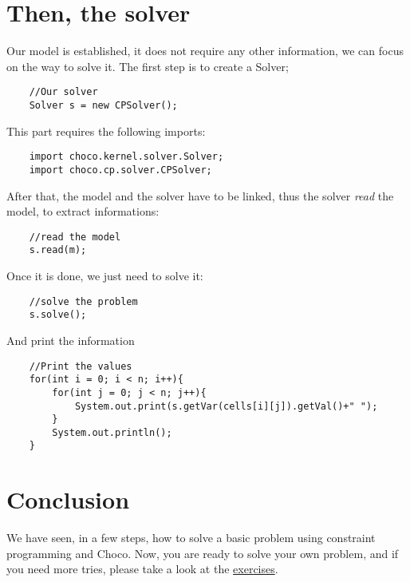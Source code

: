 \section{Then, the solver}\label{gettingstarted:then,thesolver}\hypertarget{gettingstarted:then,thesolver}{}
Our model is established, it does not require any other information, we can focus on the way to solve it.
The first step is to create a Solver;
\begin{lstlisting}
	//Our solver              
	Solver s = new CPSolver();
\end{lstlisting}
This part requires the following imports:
\begin{lstlisting}
	import choco.kernel.solver.Solver;
	import choco.cp.solver.CPSolver;
\end{lstlisting}

After that, the model and the solver have to be linked, thus the solver \emph{read} the model, to extract informations:
\begin{lstlisting}
	//read the model
	s.read(m);
\end{lstlisting}

Once it is done, we just need to solve it:
\begin{lstlisting}
	//solve the problem
	s.solve();
\end{lstlisting}
And print the information
\begin{lstlisting}
	//Print the values                                           
	for(int i = 0; i < n; i++){                                  
	    for(int j = 0; j < n; j++){                              
	        System.out.print(s.getVar(cells[i][j]).getVal()+" ");
	    }                                                        
	    System.out.println();                                    
	}
\end{lstlisting}

\section{Conclusion}\label{gettingstarted:conclusion}\hypertarget{gettingstarted:conclusion}{}
We have seen, in a few steps, how to solve a basic problem using constraint programming and Choco. Now, you are ready to solve your own problem, and if you need more tries, please take a look at the \hyperlink{exercises}{exercises}. %
